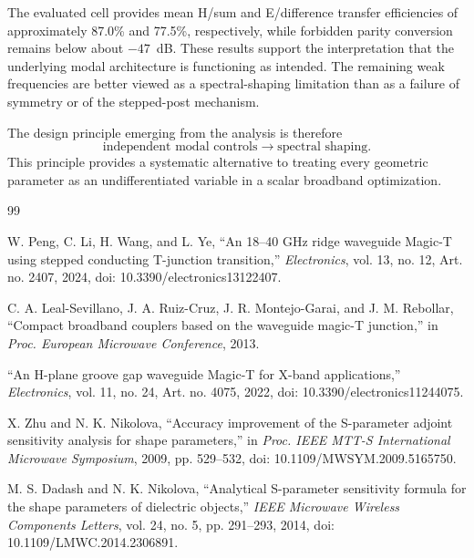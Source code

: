 \documentclass[journal]{IEEEtran}
\begin{document}
The evaluated cell provides mean H/sum and E/difference transfer efficiencies of approximately 87.0\% and 77.5\%, respectively, while forbidden parity conversion remains below about $-47$~dB.
These results support the interpretation that the underlying modal architecture is functioning as intended.
The remaining weak frequencies are better viewed as a spectral-shaping limitation than as a failure of symmetry or of the stepped-post mechanism.

The design principle emerging from the analysis is therefore
\begin{equation}
\boxed{\text{independent modal controls}\rightarrow\text{spectral shaping}.}
\end{equation}
This principle provides a systematic alternative to treating every geometric parameter as an undifferentiated variable in a scalar broadband optimization.

\begin{thebibliography}{99}

W. Peng, C. Li, H. Wang, and L. Ye,
``An 18--40 GHz ridge waveguide Magic-T using stepped conducting T-junction transition,''
\emph{Electronics}, vol. 13, no. 12, Art. no. 2407, 2024,
doi: 10.3390/electronics13122407.

C. A. Leal-Sevillano, J. A. Ruiz-Cruz, J. R. Montejo-Garai, and J. M. Rebollar,
``Compact broadband couplers based on the waveguide magic-T junction,''
in \emph{Proc. European Microwave Conference}, 2013.

``An H-plane groove gap waveguide Magic-T for X-band applications,''
\emph{Electronics}, vol. 11, no. 24, Art. no. 4075, 2022,
doi: 10.3390/electronics11244075.

X. Zhu and N. K. Nikolova,
``Accuracy improvement of the S-parameter adjoint sensitivity analysis for shape parameters,''
in \emph{Proc. IEEE MTT-S International Microwave Symposium}, 2009, pp. 529--532,
doi: 10.1109/MWSYM.2009.5165750.

M. S. Dadash and N. K. Nikolova,
``Analytical S-parameter sensitivity formula for the shape parameters of dielectric objects,''
\emph{IEEE Microwave Wireless Components Letters}, vol. 24, no. 5, pp. 291--293, 2014,
doi: 10.1109/LMWC.2014.2306891.

\end{thebibliography}
\end{document}
